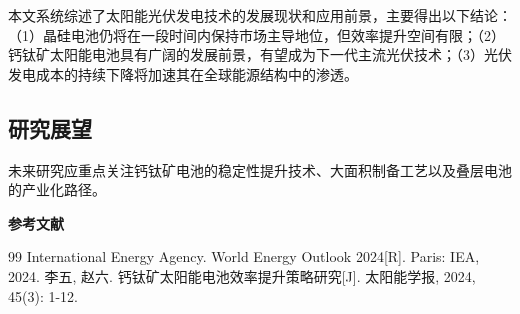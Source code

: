 \documentclass[12pt,a4paper]{ctexart}
\begin{document}
本文系统综述了太阳能光伏发电技术的发展现状和应用前景，主要得出以下结论：（1）晶硅电池仍将在一段时间内保持市场主导地位，但效率提升空间有限；（2）钙钛矿太阳能电池具有广阔的发展前景，有望成为下一代主流光伏技术；（3）光伏发电成本的持续下降将加速其在全球能源结构中的渗透。

\subsection{研究展望}

未来研究应重点关注钙钛矿电池的稳定性提升技术、大面积制备工艺以及叠层电池的产业化路径。

\renewcommand{\refname}{}
\begin{center}
    {\bfseries 参考文献}
\end{center}
\vspace{12bp}
\begin{thebibliography}{99}
 International Energy Agency. World Energy Outlook 2024[R]. Paris: IEA, 2024.
 李五, 赵六. 钙钛矿太阳能电池效率提升策略研究[J]. 太阳能学报, 2024, 45(3): 1-12.
\end{thebibliography}
\end{document}
